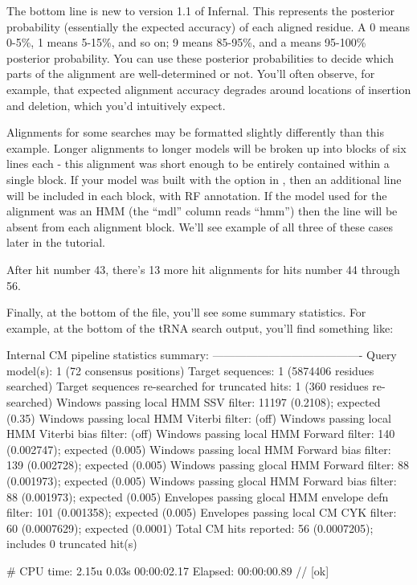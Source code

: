 The bottom line is new to version 1.1 of Infernal. This represents the
posterior probability (essentially the expected accuracy) of each
aligned residue. A 0 means 0-5\%, 1 means 5-15\%, and so on; 9 means
85-95\%, and a \otext{*} means 95-100\% posterior probability. You can
use these posterior probabilities to decide which parts of the
alignment are well-determined or not. You'll often observe, for
example, that expected alignment accuracy degrades around locations of
insertion and deletion, which you'd intuitively expect.

Alignments for some searches may be formatted slightly differently
than this example. Longer alignments to longer models will be broken
up into blocks of six lines each - this alignment was short enough to
be entirely contained within a single block.  If your model was built
with the  option in , then an additional
line will be included in each block, with RF annotation.  If the model
used for the alignment was an HMM (the ``mdl'' column reads ``hmm'')
then the  line will be absent from each alignment
block. We'll see example of all three of these cases later in the
tutorial.

After hit number 43, there's 13 more hit alignments for hits number 44
through 56. 

Finally, at the bottom of the file, you'll see some summary
statistics. For example, at the bottom of the tRNA search output,
you'll find something like:

\begin{sreoutput}
Internal CM pipeline statistics summary:
----------------------------------------
Query model(s):                                                  1  (72 consensus positions)
Target sequences:                                                1  (5874406 residues searched)
Target sequences re-searched for truncated hits:                 1  (360 residues re-searched)
Windows   passing  local HMM SSV           filter:           11197  (0.2108); expected (0.35)
Windows   passing  local HMM Viterbi       filter:                  (off)
Windows   passing  local HMM Viterbi  bias filter:                  (off)
Windows   passing  local HMM Forward       filter:             140  (0.002747); expected (0.005)
Windows   passing  local HMM Forward  bias filter:             139  (0.002728); expected (0.005)
Windows   passing glocal HMM Forward       filter:              88  (0.001973); expected (0.005)
Windows   passing glocal HMM Forward  bias filter:              88  (0.001973); expected (0.005)
Envelopes passing glocal HMM envelope defn filter:             101  (0.001358); expected (0.005)
Envelopes passing  local CM  CYK           filter:              60  (0.0007629); expected (0.0001)
Total CM hits reported:                                         56  (0.0007205); includes 0 truncated hit(s)

# CPU time: 2.15u 0.03s 00:00:02.17 Elapsed: 00:00:00.89
//
[ok]
\end{sreoutput}

